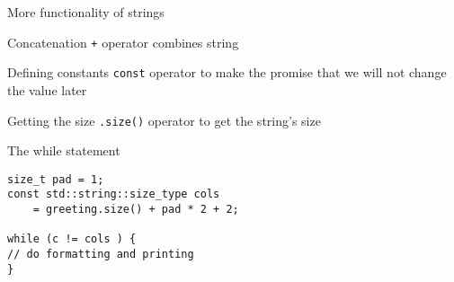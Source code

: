 \documentclass[12pt]{beamer}
\begin{document}
\begin{frame}{More functionality of strings }

\begin{block}{Concatenation}
\lstinline|+| operator combines string
\end{block}
\begin{block}{Defining constants}
\lstinline|const| operator to make the promise that we will not change the value later
\end{block}

\begin{block}{Getting the size}
\lstinline|.size()| operator to get the string's size
\end{block}
\end{frame}

\begin{frame}[fragile]{The while statement}
\begin{lstlisting}
size_t pad = 1;
const std::string::size_type cols 
	= greeting.size() + pad * 2 + 2;

while (c != cols ) {
// do formatting and printing
}
\end{lstlisting}
\end{frame}
\end{document}
